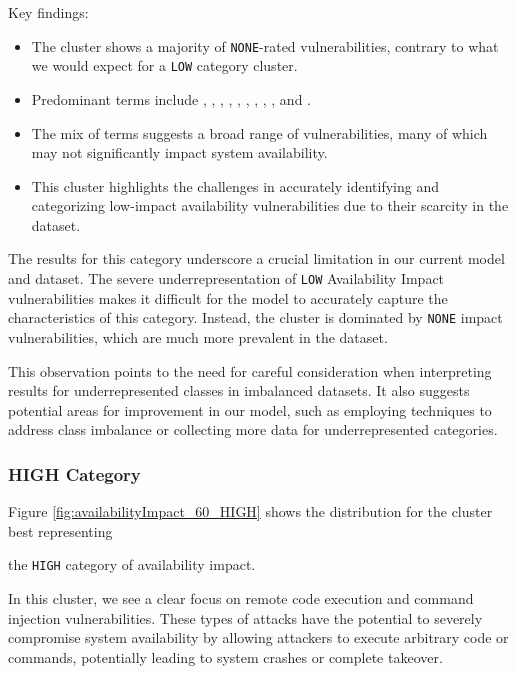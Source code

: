 \documentclass[12pt]{article}
\begin{document}
Key findings:

\begin{itemize}

	\item The cluster shows a majority of \texttt{NONE}-rated vulnerabilities, contrary to what we
	      would expect for a \texttt{LOW} category cluster.

	\item Predominant terms include , , , , , ,
	      , , , and .

	\item The mix of terms suggests a broad range of vulnerabilities, many of which may not
	      significantly impact system availability.

	\item This cluster highlights the challenges in accurately identifying and categorizing
	      low-impact availability vulnerabilities due to their scarcity in the dataset.

\end{itemize}

The results for this category underscore a crucial limitation in our current model and dataset. The
severe underrepresentation of \texttt{LOW} Availability Impact vulnerabilities makes it difficult
for the model to accurately capture the characteristics of this category. Instead, the cluster is
dominated by \texttt{NONE} impact vulnerabilities, which are much more prevalent in the dataset.

This observation points to the need for careful consideration when interpreting results for
underrepresented classes in imbalanced datasets. It also suggests potential areas for improvement in
our model, such as employing techniques to address class imbalance or collecting more data for
underrepresented categories.

\subsubsection*{HIGH Category}

Figure \ref{fig:availabilityImpact_60_HIGH} shows the distribution for the cluster best representing

the \texttt{HIGH} category of availability impact.

In this cluster, we see a clear focus on remote code execution and command injection
vulnerabilities. These types of attacks have the potential to severely compromise system
availability by allowing attackers to execute arbitrary code or commands, potentially leading to
system crashes or complete takeover.
\end{document}
